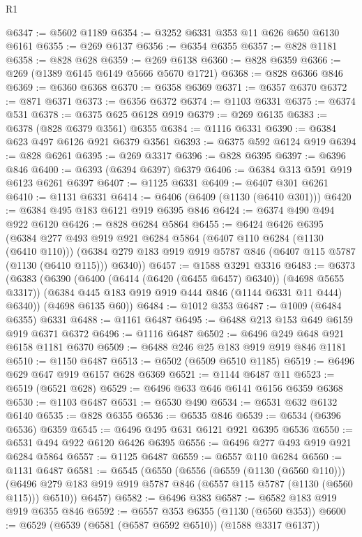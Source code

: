 \begin{lexlean}{R1}
\begin{coremodule}
@6347 := @5602 @1189
@6354 := @3252 @6331 @353 @11 @626 @650 @6130 @6161
@6355 := @269 @6137
@6356 := @6354 @6355
@6357 := @828 @1181
@6358 := @828 @628
@6359 := @269 @6138
@6360 := @828 @6359
@6366 := @269 (@1389 @6145 @6149 @5666 @5670 @1721)
@6368 := @828 @6366 @846
@6369 := @6360 @6368
@6370 := @6358 @6369
@6371 := @6357 @6370
@6372 := @871 @6371
@6373 := @6356 @6372
@6374 := @1103 @6331
@6375 := @6374 @531
@6378 := @6375 @625 @6128 @919
@6379 := @269 @6135
@6383 := @6378 (@828 @6379 @3561) @6355
@6384 := @1116 @6331
@6390 := @6384 @623 @497 @6126 @921 @6379 @3561
@6393 := @6375 @592 @6124 @919
@6394 := @828 @6261
@6395 := @269 @3317
@6396 := @828 @6395
@6397 := @6396 @846
@6400 := @6393 (@6394 @6397) @6379
@6406 := @6384 @313 @591 @919 @6123 @6261 @6397
@6407 := @1125 @6331
@6409 := @6407 @301 @6261
@6410 := @1131 @6331
@6414 := @6406 (@6409 (@1130 (@6410 @301)))
@6420 := @6384 @495 @183 @6121 @919 @6395 @846
@6424 := @6374 @490 @494 @922 @6120
@6426 := @828 @6284 @5864
@6455 := @6424
    @6426
    @6395
    (@6384
      @277
      @493
      @919
      @921
      @6284
      @5864
      (@6407 @110 @6284 (@1130 (@6410 @110)))
      (@6384 @279 @183 @919 @919 @5787 @846 (@6407 @115 @5787 (@1130 (@6410 @115))) @6340))
@6457 := @1588 @3291 @3316
@6483 := @6373
    (@6383
      (@6390
        (@6400 (@6414 (@6420 (@6455 @6457) @6340)) (@4698 @5655 @3317))
        (@6384 @445 @183 @919 @919 @444 @846 (@1144 @6331 @11 @444) @6340))
      (@4698 @6135 @60))
@6484 := @1012 @353
@6487 := @1009 (@6484 @6355) @6331
@6488 := @1161 @6487
@6495 := @6488 @213 @153 @649 @6159 @919 @6371 @6372
@6496 := @1116 @6487
@6502 := @6496 @249 @648 @921 @6158 @1181 @6370
@6509 := @6488 @246 @25 @183 @919 @919 @846 @1181
@6510 := @1150 @6487
@6513 := @6502 (@6509 @6510 @1185)
@6519 := @6496 @629 @647 @919 @6157 @628 @6369
@6521 := @1144 @6487 @11
@6523 := @6519 (@6521 @628)
@6529 := @6496 @633 @646 @6141 @6156 @6359 @6368
@6530 := @1103 @6487
@6531 := @6530 @490
@6534 := @6531 @632 @6132 @6140
@6535 := @828 @6355
@6536 := @6535 @846
@6539 := @6534 (@6396 @6536) @6359
@6545 := @6496 @495 @631 @6121 @921 @6395 @6536
@6550 := @6531 @494 @922 @6120 @6426 @6395
@6556 := @6496 @277 @493 @919 @921 @6284 @5864
@6557 := @1125 @6487
@6559 := @6557 @110 @6284
@6560 := @1131 @6487
@6581 := @6545
    (@6550
      (@6556
        (@6559 (@1130 (@6560 @110)))
        (@6496 @279 @183 @919 @919 @5787 @846 (@6557 @115 @5787 (@1130 (@6560 @115))) @6510))
      @6457)
@6582 := @6496 @383
@6587 := @6582 @183 @919 @919 @6355 @846
@6592 := @6557 @353 @6355 (@1130 (@6560 @353))
@6600 := @6529 (@6539 (@6581 (@6587 @6592 @6510)) (@1588 @3317 @6137))

\end{coremodule}
\end{lexlean}

